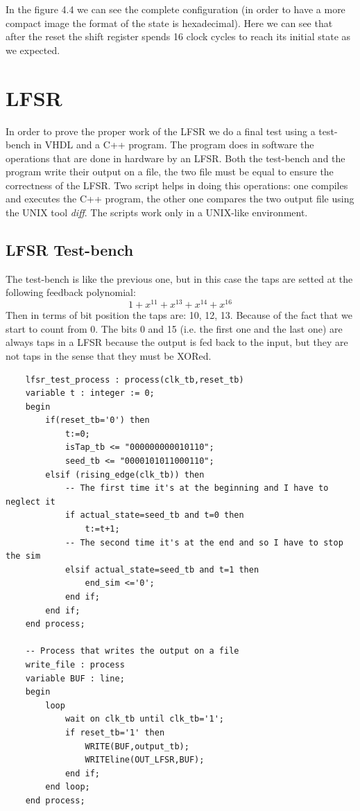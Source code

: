 \documentclass[a4paper]{report}
\begin{document}
\noindent In the figure 4.4 we can see the complete configuration (in order to have a more compact image the format of the state is hexadecimal). Here we can see that after the reset the shift register spends 16 clock cycles to reach its initial state as we expected.

\section{LFSR}
In order to prove the proper work of the LFSR we do a final test using a test-bench in VHDL and a C++ program. The program does in software the operations that are done in hardware by an LFSR. Both the test-bench and the program write their output on a file, the two file must be equal to ensure the correctness of the LFSR. Two script helps in doing this operations: one compiles and executes the C++ program, the other one compares the two output file using the UNIX tool \emph{diff}. The scripts work only in a UNIX-like environment.
\subsection{LFSR Test-bench}
\noindent The test-bench is like the previous one, but in this case the taps are setted at the following feedback polynomial: 
\[1+x^{11}+x^{13}+x^{14}+x^{16}\]
Then in terms of bit position the taps are: 10, 12, 13. Because of the fact that we start to count from 0. The bits 0 and 15 (i.e. the first one and the last one) are always taps in a LFSR because the output is fed back to the input, but they are not taps in the sense that they must be XORed.
\begin{lstlisting}
	lfsr_test_process : process(clk_tb,reset_tb)
	variable t : integer := 0;
	begin
		if(reset_tb='0') then
			t:=0;
			isTap_tb <= "000000000010110";
			seed_tb <= "0000101011000110";
		elsif (rising_edge(clk_tb)) then
			-- The first time it's at the beginning and I have to neglect it
			if actual_state=seed_tb and t=0 then
				t:=t+1;
			-- The second time it's at the end and so I have to stop the sim
			elsif actual_state=seed_tb and t=1 then	
				end_sim <='0';
			end if;
		end if;
	end process;
	
	-- Process that writes the output on a file
	write_file : process
	variable BUF : line;
	begin
		loop
			wait on clk_tb until clk_tb='1';
			if reset_tb='1' then
				WRITE(BUF,output_tb);
				WRITEline(OUT_LFSR,BUF);
			end if;
		end loop;
	end process;
\end{lstlisting}
\end{document}
